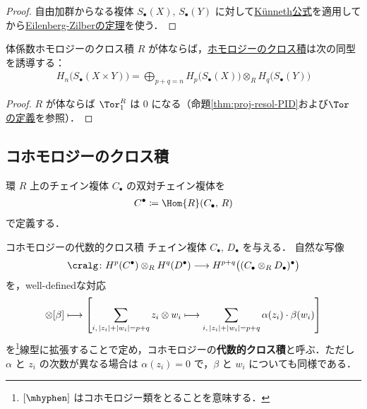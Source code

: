 \documentclass[algtopo_main]{subfiles}
\begin{document}
\begin{proof}
    自由加群からなる複体 $S_\bullet (X),\, S_\bullet(Y)$ に対して\hyperref[col:Kunneth-Tor]{K\"unneth公式}を適用してから\hyperref[thm:EZ]{Eilenberg-Zilberの定理}を使う．
\end{proof}

\begin{mycol}[]{体係数ホモロジーのクロス積}
    $R$ が体ならば，\hyperref[def:homology-cross]{ホモロジーのクロス積}は次の同型を誘導する：
    \begin{align}
        H_n \bigl(S_\bullet(X \times Y)\bigr) = \bigoplus_{p+q=n} H_p \bigl( S_\bullet (X) \bigr) \otimes_R H_q \bigl( S_\bullet(Y)  \bigr)  
    \end{align}
\end{mycol}

\begin{proof}
    $R$ が体ならば $\Tor_1^R$ は $0$ になる（命題\ref{thm:proj-resol-PID}および\hyperref[def:Tor]{$\Tor$ の定義}を参照）． 
\end{proof}

\subsection{コホモロジーのクロス積}

環 $R$ 上のチェイン複体 $C_\bullet$ の双対チェイン複体を
\begin{align}
    C^\bullet  \coloneqq \Hom{R} (C_\bullet,\, R)
\end{align}
で定義する．

\begin{mydef}[label=def:algcr-cohomology]{コホモロジーの代数的クロス積}
    チェイン複体 $C_\bullet,\, D_\bullet$ を与える．
    自然な写像
    \begin{align}
        \cralg \colon H^p(C^\bullet) \otimes_R H^q(D^\bullet) \lto H^{p+q} \bigl( (C_\bullet \otimes_R D_\bullet)^\bullet \bigr)
    \end{align}
    を，well-definedな対応
    \begin{align}
        [\alpha] \otimes [\beta] \lmto \left[ \sum_{i,\, \abs{z_i} + \abs{w_i} = p+q} z_i \otimes w_i \lmto   \sum_{i,\, \abs{z_i} + \abs{w_i} = p+q} \alpha(z_i) \cdot \beta(w_i) \right]
    \end{align}
    を\footnote{$[\mhyphen]$ はコホモロジー類をとることを意味する．}線型に拡張することで定め，コホモロジーの\textbf{代数的クロス積}と呼ぶ．ただし $\alpha$ と $z_i$ の次数が異なる場合は $\alpha(z_i) = 0$ で，$\beta$ と $w_i$ についても同様である．
\end{mydef}
\end{document}
